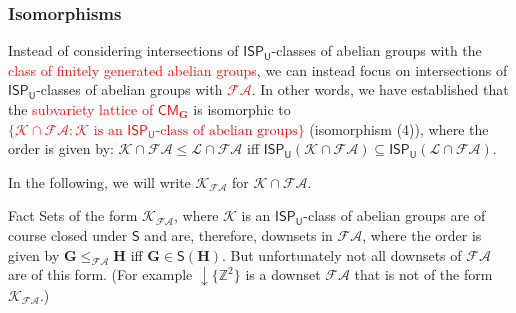 \documentclass[professionalfont, 10pt]{beamer} %
\theoremstyle{plain}
\theoremstyle{definition}
\newcommand{\m}[1]{{\mathbf {#1} }}
\begin{document}
\begin{frame}
\frametitle{Isomorphisms}
    Instead of considering intersections of $\mathsf{ISP_U}$-classes of abelian groups with the \textcolor{red}{class of finitely generated abelian groups}, we can instead focus on intersections of $\mathsf{ISP_U}$-classes of abelian groups with \textcolor{red}{$\mathcal{FA}$}.\pause
    In other words, we have established that the \textcolor{red}{subvariety lattice of $\mathsf{CM}_{\mathbf{G}}$} is isomorphic to \textcolor{red}{$\{\mathcal{K} \cap \mathcal{FA} : \mathcal{K} \text{ is an } \mathsf{ISP_U} \text{-class of abelian groups}\}$} (isomorphism (4)), where the order is given by: $\mathcal{K} \cap \mathcal{FA} \leq \mathcal{L} \cap \mathcal{FA}$ iff
    $\mathsf{ISP_U}(\mathcal{K} \cap \mathcal{FA}) \subseteq \mathsf{ISP_U}(\mathcal{L} \cap \mathcal{FA})$.

    In the following, we will write $\mathcal{K}_{ \mathcal{FA}}$ for $\mathcal{K} \cap \mathcal{FA}$.\pause
    \begin{block}{Fact}
        Sets of the form $\mathcal{K}_{\mathcal{FA}}$, where $\mathcal{K}$ is an $\mathsf{ISP_U}$-class of abelian groups are of course closed under $\mathsf{S}$ and are, therefore, downsets in $\mathcal{FA}$, where the order is given by $\m G \leq_{\mathcal{FA}} \m H$ iff $\m G \in \mathsf{S}(\m H)$.
        But unfortunately not all downsets of $\mathcal{FA}$ are of this form.
        (For example ${\downarrow} \{\mathbb{Z}^2\}$ is a downset $\mathcal{FA}$ that is not of the form  $\mathcal{K}_{\mathcal{FA}}$.)
    \end{block}
\end{frame}
\end{document}
